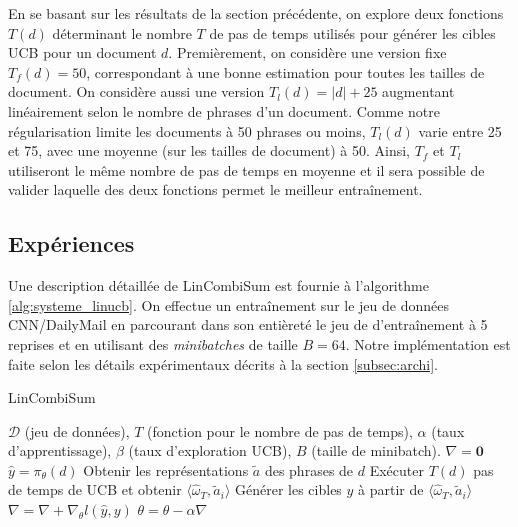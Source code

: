 En se basant sur les résultats de la section précédente, on explore deux 
fonctions $T(d)$ déterminant le nombre $T$ de pas de temps utilisés pour 
générer les cibles UCB pour un document $d$.
Premièrement, on considère une version fixe $T_f(d)=50$, correspondant à une 
bonne estimation pour toutes les tailles de document.
On considère aussi une version $T_l(d)=|d| + 25$ augmentant linéairement selon 
le nombre de phrases d'un document.
Comme notre régularisation limite les documents à 50 phrases ou moins, 
$T_l(d)$ varie entre 25 et 75, avec une moyenne (sur les tailles de document) à 
50.
Ainsi, $T_f$ et $T_l$ utiliseront le même nombre de pas de temps en moyenne 
et il sera possible de valider laquelle des deux fonctions permet 
le meilleur entraînement.

\subsection{Expériences}

Une description détaillée de LinCombiSum est fournie à l'algorithme \ref{alg:systeme_linucb}.
On effectue un entraînement sur le jeu de données CNN/DailyMail en 
parcourant dans son entièreté le jeu de d'entraînement à 5 reprises
et en utilisant des \textit{minibatches} de taille $B=64$.
Notre implémentation est faite selon les détails expérimentaux décrits à la section 
\ref{subsec:archi}.

\begin{algorithm}
    \caption{LinCombiSum}
    \begin{algorithmic}[1]
        \Require  $\mathcal{D}$ (jeu de données), $T$ (fonction pour le nombre de pas de temps), $\alpha$ (taux d'apprentissage), $\beta$ (taux d'exploration UCB), $B$ (taille de minibatch).
         
        \State $\nabla = \mathbf{0}$
        \State $\hat{y} = \pi_\theta(d)$
        \State Obtenir les représentations $\tilde{a}$ des phrases de $d$
        \State Exécuter $T(d)$ pas de temps de UCB et obtenir $\langle \hat{\omega}_T, \tilde{a}_i \rangle$
        \State Générer les cibles $y$ à partir de $\langle \hat{\omega}_T, \tilde{a}_i \rangle$ 
        \State $\nabla = \nabla + \nabla_\theta l(\hat{y}, y)$
        \EndFor
        \State $\theta = \theta - \alpha \nabla$
        \EndWhile
    \end{algorithmic}
    \label{alg:systeme_linucb}
\end{algorithm}

